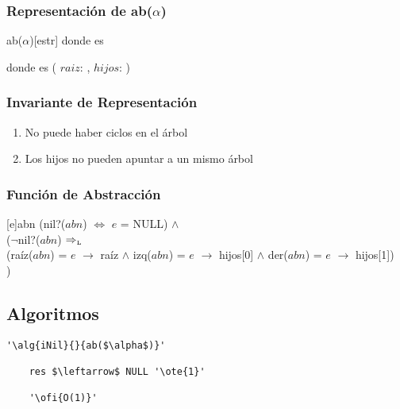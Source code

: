 	\subsubsection{Representación de ab($\alpha$)}

	\begin{Estructura}{ab($\alpha$)}[estr]
		\- \- \- \- donde  es 

		\- \- \- \- donde  es
			(
				$raiz$: \TipoVariable{$\alpha$},
				$hijos$: 
			)

	\end{Estructura}

	\subsubsection{Invariante de Representación}

		\renewcommand{\labelenumi}{(\Roman{enumi})}

		\begin{enumerate}
			\item No puede haber ciclos en el árbol
			\item Los hijos no pueden apuntar a un mismo árbol
		\end{enumerate}

	\subsubsection{Función de Abstracción}

		[e]{abn}{
			(nil?($abn$) $\Leftrightarrow$ $e$ = NULL) $\land$ \\
			($\neg$nil?($abn$) $\Rightarrow_{\mathrm{\scriptscriptstyle{L}}}$ \\
			\- (raíz($abn$) = $e$ $\rightarrow$ raíz $\land$ 
				izq($abn$) = $e$ $\rightarrow$ hijos[0] $\land$
				der($abn$) = $e$ $\rightarrow$ hijos[1]) \\
			)
		}

\subsection{Algoritmos}
	\lstset{style=alg}

	\begin{lstlisting}[mathescape]
	'\alg{iNil}{}{ab($\alpha$)}'

	res $\leftarrow$ NULL '\ote{1}'

	'\ofi{O(1)}'
	\end{lstlisting}

